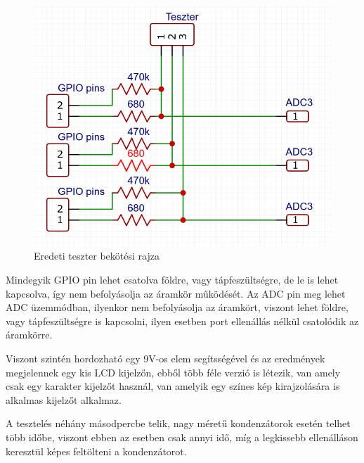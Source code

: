 \begin{figure}[h]
    \centering
    \includegraphics[scale=0.3]{figures/images/literature/OrgTesterConnection.png}
    \caption{Eredeti teszter bekötési rajza}
    \label{fig:basicTesterConnection}
\end{figure}

Mindegyik GPIO pin lehet csatolva földre, vagy tápfeszültségre, de le is lehet kapcsolva, így 
nem befolyásolja az áramkör működését. Az ADC pin meg lehet ADC üzemmódban, ilyenkor nem befolyásolja
az áramkört, viszont lehet földre, vagy tápfeszültségre is kapcsolni, ilyen esetben port ellenállás
nélkül csatolódik az áramkörre.

Viszont szintén hordozható egy 9V-os elem segítsségével és az eredmények megjelennek egy
kis LCD kijelzőn, ebből több féle verzió is létezik, van amely csak egy karakter kijelzőt
használ, van amelyik egy színes kép kirajzolására is alkalmas kijelzőt alkalmaz. 

A tesztelés néhány másodpercbe telik, nagy méretű kondenzátorok esetén telhet több időbe,
viszont ebben az esetben csak annyi idő, míg a legkissebb ellenálláson keresztül képes feltölteni
a kondenzátorot.
